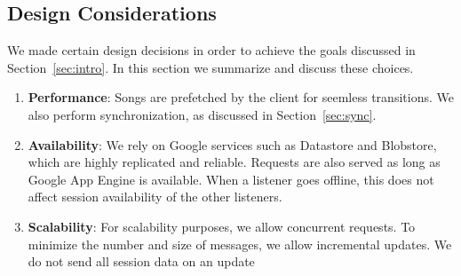 \subsection{Design Considerations}
\label{sec:considerations}
We made certain design decisions in order to achieve the goals discussed
in Section~\ref{sec:intro}. In this section we summarize and discuss these choices.
\begin{enumerate}
  \item \textbf{Performance}: Songs are prefetched by the client for seemless transitions. 
  		We also perform synchronization, as discussed in Section~\ref{sec:sync}.
  \item \textbf{Availability}: We rely on Google services such as 
  		Datastore and Blobstore, which are highly replicated and reliable. Requests are
  		also served as long as Google App Engine is available. When a listener goes offline,
  		this does not affect session availability of the other listeners. 
  \item \textbf{Scalability}: For scalability purposes, we allow concurrent requests.
  		To minimize the number and size of messages, we allow incremental
  		updates. We do not send all session data on an update
\end{enumerate}
